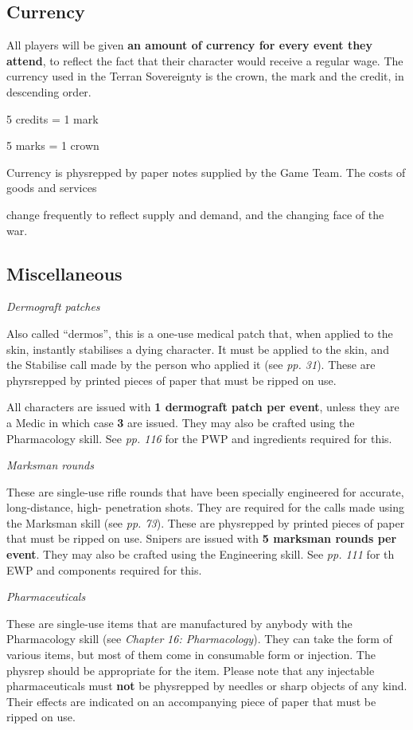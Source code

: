 \subsection{Currency}

All players will be given \textbf{an amount of currency for every event they attend}, to reflect the fact that their character would receive a regular wage. The currency used in the Terran Sovereignty is the crown, the mark and the credit, in descending order.

5 credits = 1 mark

5 marks = 1 crown

Currency is physrepped by paper notes supplied by the Game Team. The costs of goods and services

change frequently to reflect supply and demand, and the changing face of the war.

\subsection{Miscellaneous}

\textit{Dermograft patches}

Also called ``dermos'', this is a one-use medical patch that, when applied to the skin, instantly stabilises a dying character. It must be applied to the skin, and the Stabilise call made by the person who applied it (see \textit{pp. 31}). These are phyrsrepped by printed pieces of paper that must be ripped on use.

All characters are issued with \textbf{1 dermograft patch per event}, unless they are a Medic in which case \textbf{3} are issued. They may also be crafted using the Pharmacology skill. See \textit{pp. 116} for the PWP and ingredients required for this.

\textit{Marksman rounds}

These are single-use rifle rounds that have been specially engineered for accurate, long-distance, high- penetration shots. They are required for the calls made using the Marksman skill (see \textit{pp. 73}). These are physrepped by printed pieces of paper that must be ripped on use. Snipers are issued with \textbf{5 marksman rounds per event}. They may also be crafted using the Engineering skill. See \textit{pp. 111} for th EWP and components required for this.

\textit{Pharmaceuticals}

These are single-use items that are manufactured by anybody with the Pharmacology skill (see \textit{Chapter} \textit{16: Pharmacology}). They can take the form of various items, but most of them come in consumable form or injection. The physrep should be appropriate for the item. Please note that any injectable pharmaceuticals must \textbf{not} be physrepped by needles or sharp objects of any kind. Their effects are indicated on an accompanying piece of paper that must be ripped on use.


